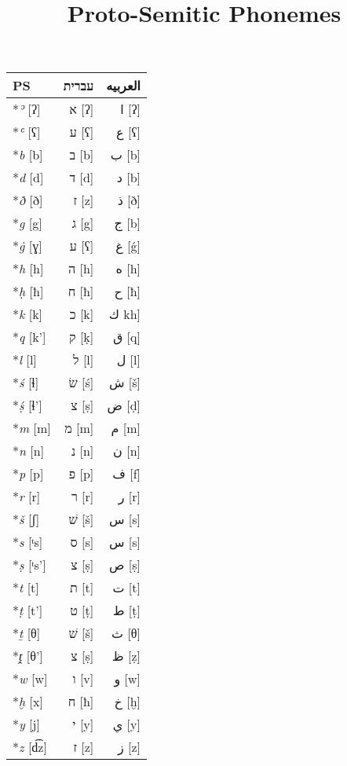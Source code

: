 \documentclass[border=0.25in]{standalone}
\begin{document}
\title{Proto-Semitic Phonemes}
\begin{tabular}{@{}lrr@{}}
  \toprule
  PS              & \texthebrew{עברית} & \textarabic{العربيه} \\
  \midrule
  *\textit{ʾ} [ʔ]   & \texthebrew{א} [ʔ] & \textarabic{ا} [ʔ] \\
  *\textit{ʿ} [ʕ]   & \texthebrew{ע} [ʕ] & \textarabic{ع} [ʕ] \\
  *\textit{b} [b]   & \texthebrew{ב} [b] & \textarabic{ب} [b] \\
  *\textit{d} [d]   & \texthebrew{ד} [d] & \textarabic{د} [b] \\
  *\textit{ð} [ð]   & \texthebrew{ז} [z] & \textarabic{ذ} [ð] \\
  *\textit{g} [g]   & \texthebrew{ג} [g] & \textarabic{ج} [b] \\
  *\textit{ġ} [ɣ]   & \texthebrew{ע} [ʕ] & \textarabic{غ} [\'{g}] \\
  *\textit{h} [h]   & \texthebrew{ה} [h] & \textarabic{ه} [h] \\ 
  *\textit{ḥ} [ħ]   & \texthebrew{ח} [ħ] & \textarabic{ح} [ħ] \\
  *\textit{k} [k]   & \texthebrew{כ} [k] & \textarabic{ك} kh] \\
  *\textit{q} [k']  & \texthebrew{ק} [ḳ] & \textarabic{ق} [q]\\
  *\textit{l} [l]   & \texthebrew{ל} [l] & \textarabic{ل} [l]\\
  *\textit{ś} [ɬ]   & \texthebrew{שׂ} [ś] & \textarabic{ش} [š]\\
  *\textit{ṣ́} [ɬ']  & \texthebrew{צ} [ṣ] & \textarabic{ض} [ḍ]\\
  *\textit{m} [m]   & \texthebrew{מ} [m] & \textarabic{م} [m]\\
  *\textit{n} [n]   & \texthebrew{נ} [n] & \textarabic{ن} [n]\\
  *\textit{p} [p]   & \texthebrew{פ} [p] & \textarabic{ف} [f]\\
  *\textit{r} [r]   & \texthebrew{ר} [r] & \textarabic{ر} [r]\\
  *\textit{š} [ʃ]   & \texthebrew{שׁ} [š] & \textarabic{س} [s]\\
  *\textit{s} [ᵗs]  & \texthebrew{ס} [s] & \textarabic{س} [s]\\
  *\textit{ṣ} [ᵗs'] & \texthebrew{צ} [ṣ] & \textarabic{ص} [ṣ]\\
  *\textit{t} [t]   & \texthebrew{ת} [t] & \textarabic{ت} [t]\\
  *\textit{ṭ} [t']  & \texthebrew{ט} [ṭ] & \textarabic{ط} [ṭ]\\
  *\textit{ṯ} [θ]   & \texthebrew{שׁ} [š] & \textarabic{ث} [θ]\\
  *\textit{ṱ} [θ']  & \texthebrew{צ} [ṣ] & \textarabic{ظ} [ẓ]\\
  *\textit{w} [w]   & \texthebrew{ו} [v] & \textarabic{و} [w]\\
  *\textit{ḫ} [x]   & \texthebrew{ח} [ħ] & \textarabic{خ} [ḫ]\\
  *\textit{y} [j]   & \texthebrew{י} [y] & \textarabic{ي} [y]\\
  *\textit{z} [d͡z]  & \texthebrew{ז} [z] & \textarabic{ز} [z]\\
  \bottomrule
\end{tabular}
\end{document}
